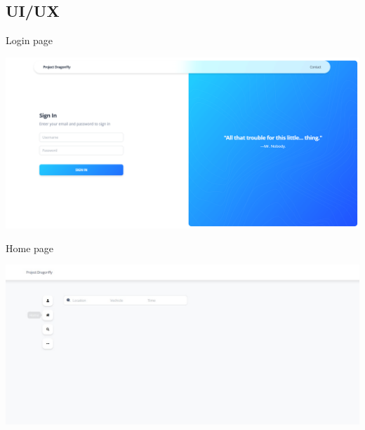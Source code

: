 \documentclass{beamer}
\begin{document}
	\subsection{UI/UX}	
	\begin{frame}{Login page}
		\begin{center}
			\includegraphics[width=1\linewidth]{res/loginpage.png}
		\end{center}
	\end{frame}

	\begin{frame}{Home page}
		\begin{center}
			\includegraphics[width=1\linewidth]{res/homepage}
		\end{center}
	\end{frame}
\end{document}
